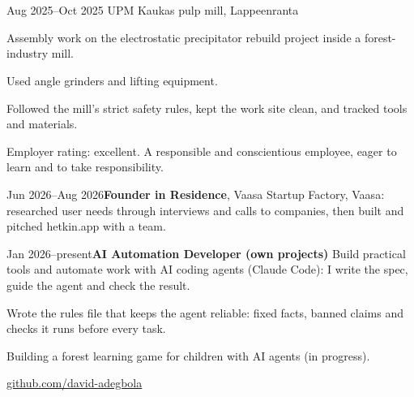 \documentclass[a4paper,11pt]{article}
\begin{document}
\section{}

\section{}
\begin{cventry}{Aug 2025--Oct 2025}{}
  UPM Kaukas pulp mill, Lappeenranta\par
  Assembly work on the electrostatic precipitator rebuild project inside a forest-industry mill.\par
  Used angle grinders and lifting equipment.\par
  Followed the mill's strict safety rules, kept the work site clean, and tracked tools and materials.\par
  Employer rating: excellent. A responsible and conscientious employee, eager to learn and to take responsibility.
\end{cventry}
\begin{cventry}{Jun 2026--Aug 2026}{\textbf{Founder in Residence}, Vaasa Startup Factory, Vaasa: researched user needs through interviews and calls to companies, then built and pitched hetkin.app with a team.}
\end{cventry}
\begin{cventry}{Jan 2026--present}{\textbf{AI Automation Developer (own projects)}}
  Build practical tools and automate work with AI coding agents (Claude Code): I write the spec, guide the agent and check the result.\par
  Wrote the rules file that keeps the agent reliable: fixed facts, banned claims and checks it runs before every task.\par
  Building a forest learning game for children with AI agents (in progress).\par
  \faGithub{} \href{https://github.com/david-adegbola}{github.com/david-adegbola}
\end{cventry}
\end{document}
